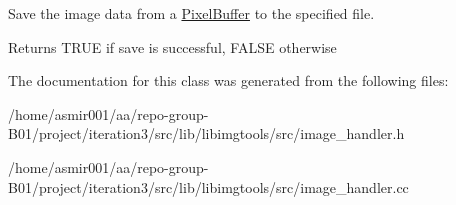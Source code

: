 Save the image data from a \hyperlink{classimage__tools_1_1PixelBuffer}{Pixel\+Buffer} to the specified file. 

\begin{DoxyReturn}{Returns}
T\+R\+UE if save is successful, F\+A\+L\+SE otherwise 
\end{DoxyReturn}


The documentation for this class was generated from the following files\+:\begin{DoxyCompactItemize}
\item 
/home/asmir001/aa/repo-\/group-\/\+B01/project/iteration3/src/lib/libimgtools/src/image\+\_\+handler.\+h\item 
/home/asmir001/aa/repo-\/group-\/\+B01/project/iteration3/src/lib/libimgtools/src/image\+\_\+handler.\+cc\end{DoxyCompactItemize}

